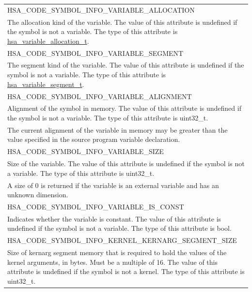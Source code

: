 \documentclass[final,oneside]{book}
\newcommand{\reftyp}[1]{#1}
\newcommand{\refenu}[1]{\reftyp{#1}}
\begin{document}
\begin{longtable}{@{\hspace{2em}}p{\linewidth-2em}}
\hspace{-2em}\refenu{HSA_\-CODE_\-SYMBOL_\-INFO_\-VARIABLE_\-ALLOCATION}\\The allocation kind of the variable. The value of this attribute is undefined if the symbol is not a variable. The type of this attribute is \hyperlink{group__symbol-attributes_1ga0fdb971a44d3e02d1bd5ff889624461a}{hsa_\-variable_\-allocation_\-t}.\\[2mm]
\hspace{-2em}\refenu{HSA_\-CODE_\-SYMBOL_\-INFO_\-VARIABLE_\-SEGMENT}\\The segment kind of the variable. The value of this attribute is undefined if the symbol is not a variable. The type of this attribute is \hyperlink{group__symbol-attributes_1ga7fb2a9fe278f7ab892eb158277e2dd8c}{hsa_\-variable_\-segment_\-t}.\\[2mm]
\hspace{-2em}\refenu{HSA_\-CODE_\-SYMBOL_\-INFO_\-VARIABLE_\-ALIGNMENT}\\Alignment of the symbol in memory. The value of this attribute is undefined if the symbol is not a variable. The type of this attribute is uint32_\-t.\\[2mm]
The current alignment of the variable in memory may be greater than the value specified in the source program variable declaration.\\[2mm]
\hspace{-2em}\refenu{HSA_\-CODE_\-SYMBOL_\-INFO_\-VARIABLE_\-SIZE}\\Size of the variable. The value of this attribute is undefined if the symbol is not a variable. The type of this attribute is uint32_\-t.\\[2mm]
A size of 0 is returned if the variable is an external variable and has an unknown dimension.\\[2mm]
\hspace{-2em}\refenu{HSA_\-CODE_\-SYMBOL_\-INFO_\-VARIABLE_\-IS_\-CONST}\\Indicates whether the variable is constant. The value of this attribute is undefined if the symbol is not a variable. The type of this attribute is bool.\\[2mm]
\hspace{-2em}\refenu{HSA_\-CODE_\-SYMBOL_\-INFO_\-KERNEL_\-KERNARG_\-SEGMENT_\-SIZE}\\Size of kernarg segment memory that is required to hold the values of the kernel arguments, in bytes. Must be a multiple of 16. The value of this attribute is undefined if the symbol is not a kernel. The type of this attribute is uint32_\-t.\\[2mm]

\end{longtable}
\end{document}
